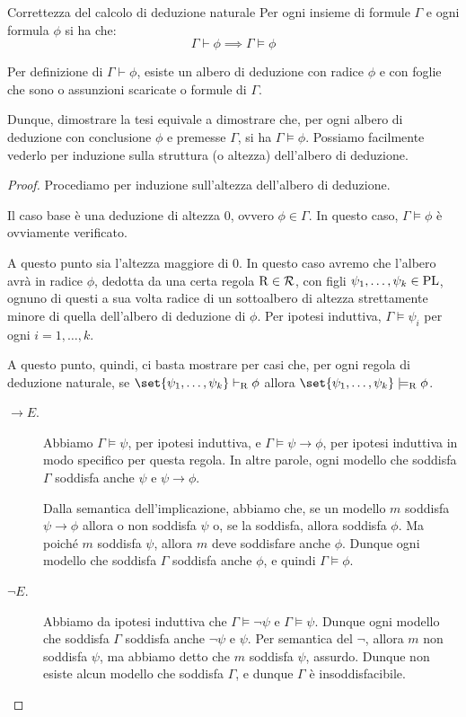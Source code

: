 \begin{theorem}{Correttezza del calcolo di deduzione naturale}
  Per ogni insieme di formule \(\Gamma\) e ogni formula \(\phi\) si ha che:
  \[\Gamma \vdash \phi \implies \Gamma \models \phi\]
\end{theorem}

Per definizione di \(\Gamma\vdash\phi\), esiste un albero di deduzione con radice \(\phi\) e con foglie che sono o assunzioni scaricate o formule di \(\Gamma\).

Dunque, dimostrare la tesi equivale a dimostrare che, per ogni albero di deduzione con conclusione \(\phi\) e premesse \(\Gamma\), si ha \(\Gamma\models\phi\).
Possiamo facilmente vederlo per induzione sulla struttura (o altezza) dell'albero di deduzione.

\begin{proof}
  Procediamo per induzione sull'altezza dell'albero di deduzione.
  
  Il caso base è una deduzione di altezza \(0\), ovvero \(\phi \in \Gamma\). In questo caso, \(\Gamma\models\phi\) è ovviamente verificato.

  A questo punto sia l'altezza maggiore di \(0\). In questo caso avremo che l'albero avrà in radice \(\phi\), dedotta da una certa regola \(\operatorname{R} \in \mathcal{R}\), con figli \(\psi_1,\ldots,\psi_k \in \operatorname{PL}\), ognuno di questi a sua volta radice di un sottoalbero di altezza strettamente minore di quella dell'albero di deduzione di \(\phi\). Per ipotesi induttiva, \(\Gamma\models\psi_i\) per ogni \(i=1,\ldots,k\).

  A questo punto, quindi, ci basta mostrare per casi che, per ogni regola di deduzione naturale, se \(\set{\psi_1,\ldots,\psi_k} \vdash_{\Rule} \phi\) allora \(\set{\psi_1,\ldots,\psi_k} \models_{\Rule} \phi\).

  \begin{description}
    \item[\(\to E\).] Abbiamo \(\Gamma\models\psi\), per ipotesi induttiva, e \(\Gamma\models\psi\to\phi\), per ipotesi induttiva in modo specifico per questa regola.
    In altre parole, ogni modello che soddisfa \(\Gamma\) soddisfa anche \(\psi\) e \(\psi\to\phi\).
      
    Dalla semantica dell'implicazione, abbiamo che, se un modello \(m\) soddisfa \(\psi\to\phi\) allora o non soddisfa \(\psi\) o, se la soddisfa, allora soddisfa \(\phi\). Ma poiché \(m\) soddisfa \(\psi\), allora \(m\) deve soddisfare anche \(\phi\). Dunque ogni modello che soddisfa \(\Gamma\) soddisfa anche \(\phi\), e quindi \(\Gamma\models\phi\).
    \item[\(\neg E\).] Abbiamo da ipotesi induttiva che \(\Gamma\models\neg\psi\) e \(\Gamma\models\psi\). Dunque ogni modello che soddisfa \(\Gamma\) soddisfa anche \(\neg\psi\) e \(\psi\). Per semantica del \(\neg\), allora \(m\) non soddisfa \(\psi\), ma abbiamo detto che \(m\) soddisfa \(\psi\), assurdo. Dunque non esiste alcun modello che soddisfa \(\Gamma\), e dunque \(\Gamma\) è insoddisfacibile.


\end{description}
\end{proof}

